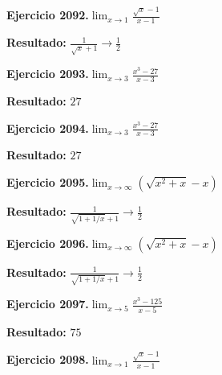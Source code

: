 \documentclass[10pt,a4paper]{article}
\begin{document}
\begin{ejbox}
\textbf{Ejercicio 2092.}\quad $\lim_{x\to 1} \frac{\sqrt{x}-1}{x-1}$
\end{ejbox}

\begin{solbox}
\textbf{Resultado:} \(\displaystyle \frac{1}{\sqrt{x}+1} \to \frac{1}{2}\)
\end{solbox}

\newpage
\begin{ejbox}
\textbf{Ejercicio 2093.}\quad $\lim_{x\to 3} \frac{x^3-27}{x-3}$
\end{ejbox}

\begin{solbox}
\textbf{Resultado:} \(\displaystyle 27\)
\end{solbox}

\begin{ejbox}
\textbf{Ejercicio 2094.}\quad $\lim_{x\to 3} \frac{x^3-27}{x-3}$
\end{ejbox}

\begin{solbox}
\textbf{Resultado:} \(\displaystyle 27\)
\end{solbox}

\begin{ejbox}
\textbf{Ejercicio 2095.}\quad $\lim_{x\to \infty} (\sqrt{x^2+x} - x)$
\end{ejbox}

\begin{solbox}
\textbf{Resultado:} \(\displaystyle \frac{1}{\sqrt{1+1/x}+1} \to \frac{1}{2}\)
\end{solbox}

\newpage
\begin{ejbox}
\textbf{Ejercicio 2096.}\quad $\lim_{x\to \infty} (\sqrt{x^2+x} - x)$
\end{ejbox}

\begin{solbox}
\textbf{Resultado:} \(\displaystyle \frac{1}{\sqrt{1+1/x}+1} \to \frac{1}{2}\)
\end{solbox}

\begin{ejbox}
\textbf{Ejercicio 2097.}\quad $\lim_{x\to 5} \frac{x^3-125}{x-5}$
\end{ejbox}

\begin{solbox}
\textbf{Resultado:} \(\displaystyle 75\)
\end{solbox}

\begin{ejbox}
\textbf{Ejercicio 2098.}\quad $\lim_{x\to 1} \frac{\sqrt{x}-1}{x-1}$
\end{ejbox}
\end{document}
